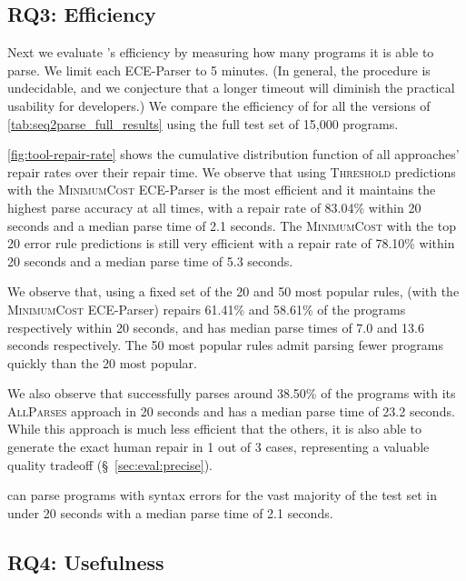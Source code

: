 \subsection{RQ3: Efficiency}
\label{sec:eval:efficiency}

Next we evaluate \toolname's efficiency by measuring how many programs it is
able to parse. We limit each ECE-Parser to 5 minutes. (In general, the procedure
is undecidable, and we conjecture that a longer timeout will diminish the
practical usability for developers.) We compare the efficiency of \toolname for
all the versions of \autoref{tab:seq2parse_full_results} using the full test set
of 15,000 programs.

\autoref{fig:tool-repair-rate} shows the cumulative distribution function of all
\toolname approaches' repair rates over their repair time. We observe that using
\textsc{Threshold} predictions with the \textsc{MinimumCost} ECE-Parser is the
most efficient and it maintains the highest parse accuracy at all times, with a
repair rate of 83.04\% within 20 seconds and a median parse time of 2.1 seconds.
The \textsc{MinimumCost} with the top 20 error rule predictions is still very
efficient with a repair rate of 78.10\% within 20 seconds and a median parse
time of 5.3 seconds. 

We observe that, using a fixed set of the 20 and 50 most popular rules,
\toolname (with the \textsc{MinimumCost} ECE-Parser) repairs 61.41\% and 58.61\%
of the programs respectively within 20 seconds, and has median parse times of
7.0 and 13.6 seconds respectively. The 50 most popular rules admit parsing fewer
programs quickly than the 20 most popular.

We also observe that \toolname successfully parses around 38.50\% of the
programs with its \textsc{AllParses} approach in 20 seconds and has a median
parse time of 23.2 seconds. While this approach is much less efficient that the
others, it is also able to generate the exact human repair in 1 out of 3
cases, representing a valuable quality tradeoff (\S~\ref{sec:eval:precise}).

\begin{framed}
  \noindent \toolname can parse programs with syntax errors for the vast
  majority of the test set in under 20 seconds with a median parse time of 2.1
  seconds.
\end{framed}

\subsection{RQ4: Usefulness}
\label{sec:eval:useful}

